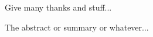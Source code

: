 \documentclass[a4paper, 12pt, oneside]{report}         %
\begin{document}

\thesistitlepage                                  %

\thesisdeclarationpage				  %

\thesispermissionpage				  %


\begin{thesisacknowledgments}                     %
Give many thanks and stuff...

\end{thesisacknowledgments}                       %

\begin{thesisabstract}

The abstract or summary or whatever...

\end{thesisabstract}

\tableofcontents                                  %
\listoftables                                     %
\listoffigures                                    %

                                  
                                  
  
  
  
  
  


\begin{appendix}

%
\end{appendix}



\begin{thebibliography}{ieeetr}                   %



\end{thebibliography}                             %
\end{document}
